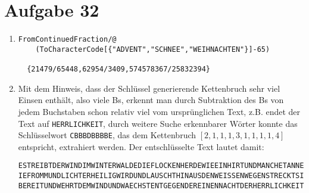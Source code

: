 \section*{Aufgabe 32}
\begin{enumerate}
	\item
	\lstset{language=Mathematica}
	\begin{lstlisting}
FromContinuedFraction/@
	(ToCharacterCode[{"ADVENT","SCHNEE","WEIHNACHTEN"}]-65)

  {21479/65448,62954/3409,574578367/25832394}
	\end{lstlisting}
	\item Mit dem Hinweis, dass der Schlüssel generierende Kettenbruch sehr
	viel Einsen enthält, also viele Bs, erkennt man durch Subtraktion des
	Bs von jedem Buchstaben schon relativ viel vom ursprünglichen Text,
	z.B. endet der Text auf \verb/HERRLICHKEIT/, durch weitere Suche
	erkennbarer Wörter konnte das Schlüsselwort \verb/CBBBDBBBBE/, das dem
	Kettenbruch $[2,1,1,1,3,1,1,1,1,4]$ entspricht, extrahiert werden. Der
	entschlüsselte Text lautet damit:

\begin{verbatim}
ESTREIBTDERWINDIMWINTERWALDEDIEFLOCKENHERDEWIEEINHIRTUNDMANCHETANNEAHNTWIEBALDES
IEFROMMUNDLICHTERHEILIGWIRDUNDLAUSCHTHINAUSDENWEISSENWEGENSTRECKTSIEDIEZWEIGEHIN
BEREITUNDWEHRTDEMWINDUNDWAECHSTENTGEGENDEREINENNACHTDERHERRLICHKEIT
\end{verbatim}
\end{enumerate}


